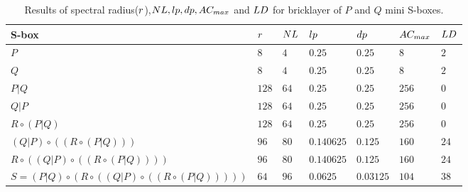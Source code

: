 \begin{example}
\begin{table}[htbp]
\caption{Results of spectral radius($\crit{r}$),$\crit{NL}, \crit{lp}, \crit{dp}, \crit{AC_{max}}$ and $\crit{LD}$ for bricklayer of $P$ and $Q$ mini S-boxes.}
\centering
\label{tab:Khazad}
\begin{tabular}{ l l l l l l l }
\toprule
S-box & $\crit{r}$ & $\crit{NL}$ & $\crit{lp}$ & $\crit{dp}$ & $\crit{AC_{max}}$ & $\crit{LD}$ \\
\midrule
$P$ & $8$ & $4$ & $0.25$ & $0.25$ & $8$ & $2$ \\
$Q$ & $8$ & $4$ & $0.25$ & $0.25$ & $8$ & $2$ \\
$P | Q$ & $128$ & $64$ & $0.25$ & $0.25$ & $256$ & $0$ \\
$Q | P$ & $128$ & $64$ & $0.25$ & $0.25$ & $256$ & $0$ \\
$R \circ (P | Q)$ & $128$ & $64$ & $0.25$ & $0.25$ & $256$ & $0$ \\
$(Q|P) \circ \left( \left( R \circ (P | Q) \right) \right)$ & $96$ & $80$ & $0.140625$ & $0.125$ & $160$ & $24$ \\
$R \circ \left( (Q|P) \circ \left( \left( R \circ (P | Q) \right) \right) \right)$ & $96$ & $80$ & $0.140625$ & $0.125$ & $160$ & $24$ \\
$S = (P|Q) \circ \left( R \circ \left( (Q|P) \circ \left( \left( R \circ (P | Q) \right) \right) \right) \right)$ & $64$ & $96$ & $0.0625$ & $0.03125$ & $104$ & $38$ \\
\bottomrule
\end{tabular}
\end{table}

\end{example}

